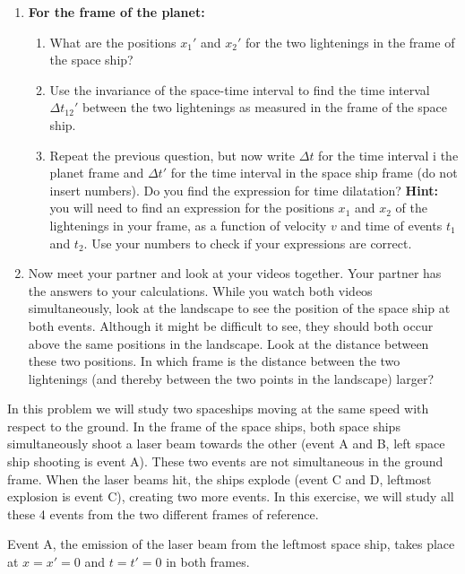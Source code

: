 {\begin{multicols}{2}
\begin{enumerate}
\begin{enumerate}
\end{enumerate}
\item {\bf For the frame of the planet:}
\begin{enumerate}
\item What are the positions $x_1'$ and $x_2'$ for the two lightenings in the frame of the space ship?
\item Use the invariance of the space-time interval to find the time interval $\Delta t_\mathrm{12}'$ between the two lightenings as measured in the frame of the space ship.
\item Repeat the previous question, but now write $\Delta t$ for the time interval i the planet frame and $\Delta t'$ for the time interval in the space ship frame (do not insert numbers). Do you find the expression for time dilatation? {\bf Hint:} you will need to find an expression for the positions $x_1$ and $x_2$ of the lightenings in your frame, as a function of velocity $v$ and time of events $t_1$ and $t_2$. Use your numbers to check if your expressions are correct.
\end{enumerate}
\item Now meet your partner and look at your videos together. Your partner has the answers to your calculations. While you watch both videos simultaneously, look at the landscape to see the position of the space ship at both events. Although it might be difficult to see, they should both occur above the same positions in the landscape. Look at the distance between these two positions. In which frame is the distance between the two lightenings (and thereby between the two points in the landscape) larger?
\end{enumerate}

\vspace{0.5cm}




In this problem we will study two spaceships moving at the same speed with respect to the ground. In the frame of the space ships, both space ships simultaneously shoot a laser beam towards the other (event A and B, left space ship shooting is event A). These two events are not simultaneous in the ground frame. When the laser beams hit, the ships explode (event C and D, leftmost explosion is event C), creating two more events. In this exercise, we will study all these 4 events from the two different frames of reference.

Event A, the emission of the laser beam from the leftmost space ship, takes place at $x=x'=0$ and $t=t'=0$ in both frames.


\end{multicols}}
